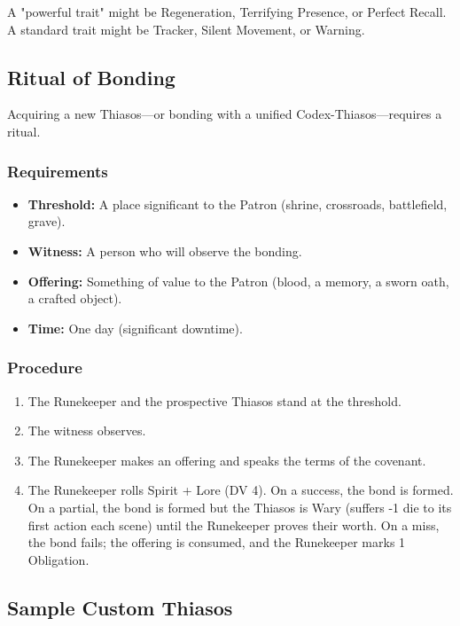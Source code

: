 A "powerful trait" might be Regeneration, Terrifying Presence, or Perfect Recall. A standard trait might be Tracker, Silent Movement, or Warning.

\subsection{Ritual of Bonding}

Acquiring a new Thiasos—or bonding with a unified Codex-Thiasos—requires a ritual.

\subsubsection{Requirements}

\begin{itemize}
\item \textbf{Threshold:} A place significant to the Patron (shrine, crossroads, battlefield, grave).
\item \textbf{Witness:} A person who will observe the bonding.
\item \textbf{Offering:} Something of value to the Patron (blood, a memory, a sworn oath, a crafted object).
\item \textbf{Time:} One day (significant downtime).
\end{itemize}

\subsubsection{Procedure}

\begin{enumerate}
\item The Runekeeper and the prospective Thiasos stand at the threshold.
\item The witness observes.
\item The Runekeeper makes an offering and speaks the terms of the covenant.
\item The Runekeeper rolls Spirit + Lore (DV 4). On a success, the bond is formed. On a partial, the bond is formed but the Thiasos is Wary (suffers -1 die to its first action each scene) until the Runekeeper proves their worth. On a miss, the bond fails; the offering is consumed, and the Runekeeper marks 1 Obligation.
\end{enumerate}

\subsection{Sample Custom Thiasos}

